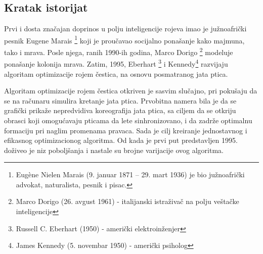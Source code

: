 \documentclass[a4paper]{article}
\begin{document}
\subsection{Kratak istorijat}
Prvi i dosta značajan doprinos u polju inteligencije rojeva imao je južnoafrički pesnik Eugene Marais \footnote{Eugène Nielen Marais (9. januar 1871 – 29. mart 1936) je bio južnoafrički advokat, naturalista, pesnik i pisac.} koji je proučavao socijalno ponašanje kako majmuna, tako i mrava. Posle njega, ranih 1990-ih godina, Marco Dorigo \footnote{Marco Dorigo (26. avgust 1961) - italijanski istraživač na polju veštačke inteligencije} modeluje ponašanje kolonija mrava. Zatim, 1995, Eberhart \footnote{Russell C. Eberhart (1950) - američki elektroinženjer} i Kennedy\footnote{James Kennedy (5. novembar 1950) - američki psiholog} razvijaju algoritam optimizacije rojem čestica, na osnovu posmatranog jata ptica.

 Algoritam optimizacije rojem čestica otkriven je sasvim slučajno, pri pokušaju da se na računaru simulira kretanje jata ptica. Prvobitna namera bila je da se grafički prikaže nepredvidiva koreografija jata ptica, sa ciljem da se otkriju obrasci koji omogućavaju pticama da lete sinhronizovano, i da zadrže optimalnu formaciju pri naglim promenama pravaca. Sada je cilj kreiranje jednostavnog i efikasnog optimizacionog algoritma. Od kada je prvi put predstavljen 1995. doživeo je niz poboljšanja i nastale su brojne varijacije ovog algoritma. 
\end{document}
